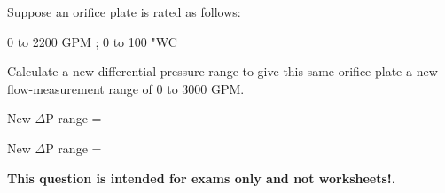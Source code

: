 

Suppose an orifice plate is rated as follows:

\vskip 10pt

\hskip 40pt 0 to 2200 GPM ; 0 to 100 "WC

\vskip 10pt

Calculate a new differential pressure range to give this same orifice plate a new flow-measurement range of 0 to 3000 GPM.

\vskip 10pt

New $\Delta$P range = \underbar{\hskip 50pt}







New $\Delta$P range = 







{\bf This question is intended for exams only and not worksheets!}.



